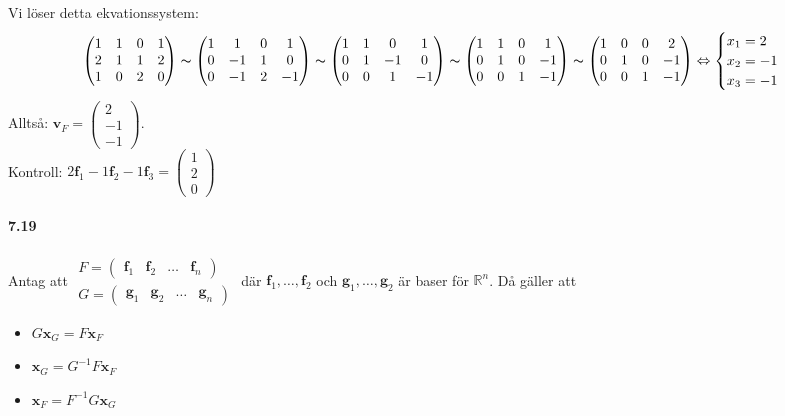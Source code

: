 Vi löser detta ekvationssystem:
\begin{equation*}
    \begin{pmatrix}
        1&1&0&1\\
        2&1&1&2\\
        1&0&2&0
    \end{pmatrix}
    \thicksim
    \begin{pmatrix}
        1&1&0&1\\
        0&-1&1&0\\
        0&-1&2&-1
    \end{pmatrix}
    \thicksim
    \begin{pmatrix}
        1&1&0&1\\
        0&1&-1&0\\
        0&0&1&-1
    \end{pmatrix}
    \thicksim
    \begin{pmatrix}
        1&1&0&1\\
        0&1&0&-1\\
        0&0&1&-1
    \end{pmatrix}
    \thicksim
    \begin{pmatrix}
        1&0&0&2\\
        0&1&0&-1\\
        0&0&1&-1
    \end{pmatrix}
    \Leftrightarrow
    \begin{cases}
        x_1=2\\
        x_2=-1\\
        x_3=-1
    \end{cases}
\end{equation*}
Alltså: $\bm{v}_F=\begin{pmatrix}2\\-1\\-1\end{pmatrix}$.\\
Kontroll: $2\bm{f}_1-1\bm{f}_2-1\bm{f}_3=\begin{pmatrix}1\\2\\0\end{pmatrix}$

\paragraph{7.19} Antag att $\begin{matrix}
    F=\begin{pmatrix}\bm{f}_1&\bm{f}_2&\ldots&\bm{f}_n\end{pmatrix}\\
    G=\begin{pmatrix}\bm{g}_1&\bm{g}_2&\ldots&\bm{g}_n\end{pmatrix}
\end{matrix}$ där $\bm{f}_1,\ldots,\bm{f}_2$ och $\bm{g}_1,\ldots,\bm{g}_2$ är baser för $\mathbb{R}^{n}$.
Då gäller att
\begin{itemize}
    \item $G\bm{x}_G=F\bm{x}_F$
    \item $\bm{x}_G=G^{-1}F\bm{x}_F$
    \item $\bm{x}_F=F^{-1}G\bm{x}_G$
\end{itemize}

